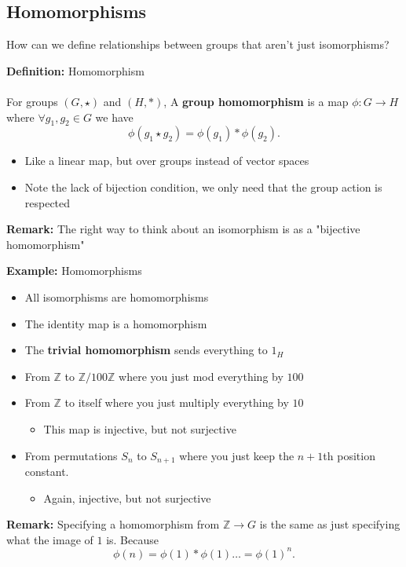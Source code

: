 \documentclass{article}
\newcommand{\Z}{\mathbb{Z}}
\begin{document}
\subsection{Homomorphisms}
How can we define relationships between groups that aren't just isomorphisms?
\begin{definition} 
\textbf{Definition:}  Homomorphism\\
~\\
For groups $(G,\star)$ and $(H,*)$, A {\color{blue} \textbf{group homomorphism}} is a map $\phi: G\to H$ where $\forall g_1, g_2 \in G$ we have
\[
	\phi(g_1\star g_2) = \phi(g_1) * \phi(g_2)
.\] 
\begin{itemize}
	\item Like a linear map, but over groups instead of vector spaces
	\item Note the lack of bijection condition, we only need that the group action is respected
\end{itemize}
\end{definition}
\begin{remark} 
\textbf{Remark:} The right way to think about an isomorphism is as a "bijective homomorphism" 
\end{remark}
\begin{example} 
\textbf{Example:} Homomorphisms
\begin{itemize}
	\item All isomorphisms are homomorphisms
	\item The identity map is a homomorphism
	\item The {\color{blue} \textbf{trivial homomorphism}} sends everything to $1_H$
	\item From $\Z$ to $\Z/{100\Z}$ where you just mod everything by $100$
	\item From $\Z$ to itself where you just multiply everything by $10$
		\begin{itemize}
			\item This map is injective, but not surjective
		\end{itemize}
	\item From permutations $S_n$ to $S_{n+1}$ where you just keep the $n+1$th position constant.
		\begin{itemize}
			\item Again, injective, but not surjective
		\end{itemize}
\end{itemize}
\end{example}
\begin{remark} 
	\textbf{Remark:} Specifying a homomorphism from $\Z\to G$ is the same as just specifying what the image of $1$ is. Because \[
		\phi(n) = \phi(1) * \phi(1) \ldots = \phi(1)^n
	.\]  
\end{remark}
\end{document}

